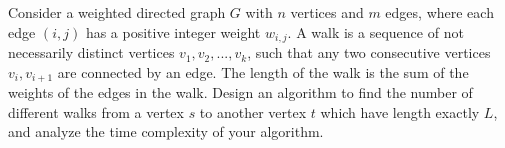 \problem{}
Consider a weighted directed graph $G$ with $n$ vertices and $m$ edges, where each edge $(i,j)$ has a positive integer weight $w_{i, j}$. A  walk is a sequence of not necessarily distinct vertices $v_1, v_2, ..., v_k$, such that any two consecutive vertices $v_i, v_{i+1}$ are connected by an edge. The length of the walk is the sum of the weights of the edges in the walk.  Design an algorithm to find the number of different walks from a vertex $s$ to another vertex $t$ which have length exactly $L$, and analyze the time complexity of your algorithm. 

\solution{}














